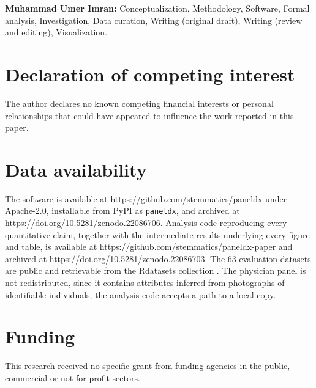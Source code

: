 \documentclass[preprint,12pt]{elsarticle}
\begin{document}
\sloppy
\textbf{Muhammad Umer Imran:} Conceptualization, Methodology, Software, Formal
analysis, Investigation, Data curation, Writing (original draft), Writing
(review and editing), Visualization.

\section*{Declaration of competing interest}

The author declares no known competing financial interests or personal
relationships that could have appeared to influence the work reported in this
paper.

\section*{Data availability}

\sloppy

The software is available at \url{https://github.com/stemmatics/paneldx} under
Apache-2.0, installable from PyPI as \texttt{paneldx}, and archived at
\url{https://doi.org/10.5281/zenodo.22086706}. Analysis code reproducing every
quantitative claim, together with the intermediate results underlying every
figure and table, is available at
\url{https://github.com/stemmatics/paneldx-paper} and archived at
\url{https://doi.org/10.5281/zenodo.22086703}. The 63 evaluation datasets are
public and retrievable from the Rdatasets collection \cite{arel2018}. The
physician panel is not redistributed, since it contains attributes inferred from
photographs of identifiable individuals; the analysis code accepts a path to a
local copy.

\section*{Funding}

This research received no specific grant from funding agencies in the public,
commercial or not-for-profit sectors.
\end{document}
